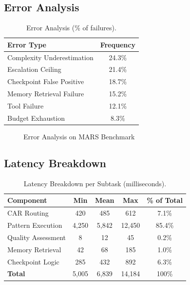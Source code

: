 \documentclass{article}
\theoremstyle{plain}
\theoremstyle{definition}
\theoremstyle{remark}
\begin{document}
\subsection{Error Analysis}
\begin{table}[h]
	\caption{Error Analysis (\% of failures).}
	\label{tab:errors}
	\centering
	\small
	\begin{tabular}{@{}lc@{}}
		\toprule
		\textbf{Error Type} & \textbf{Frequency} \\
		\midrule
		Complexity Underestimation & 24.3\% \\
		Escalation Ceiling & 21.4\% \\
		Checkpoint False Positive & 18.7\% \\
		Memory Retrieval Failure & 15.2\% \\
		Tool Failure & 12.1\% \\
		Budget Exhaustion & 8.3\% \\
		\bottomrule
	\end{tabular}
\end{table}

\begin{figure}[h]
	\centering
	\scalebox{0.6}{}
	\caption{Error Analysis on MARS Benchmark}
	\label{fig:framework8}
\end{figure}

\subsection{Latency Breakdown}
\begin{table}[h]
	\caption{Latency Breakdown per Subtask (milliseconds).}
	\label{tab:overhead}
	\centering
	\small
	\begin{tabular}{@{}lcccc@{}}
		\toprule
		\textbf{Component} & \textbf{Min} & \textbf{Mean} & \textbf{Max} & \textbf{\% of Total} \\
		\midrule
		CAR Routing & 420 & 485 & 612 & 7.1\% \\
		Pattern Execution & 4,250 & 5,842 & 12,450 & 85.4\% \\
		Quality Assessment & 8 & 12 & 45 & 0.2\% \\
		Memory Retrieval & 42 & 68 & 185 & 1.0\% \\
		Checkpoint Logic & 285 & 432 & 892 & 6.3\% \\
		\midrule
		\textbf{Total} & 5,005 & 6,839 & 14,184 & 100\% \\
		\bottomrule
	\end{tabular}
\end{table}
\end{document}
